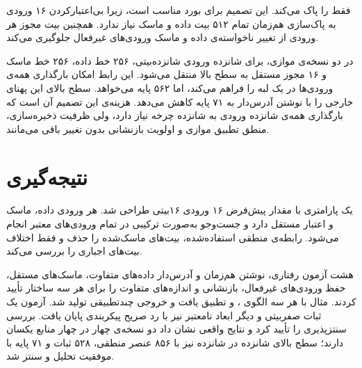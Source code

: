  فقط  را پاک می‌کند. این تصمیم برای بورد مناسب است، زیرا
بی‌اعتبارکردن ۱۶ ورودی به پاک‌سازی هم‌زمان تمام ۵۱۲ بیت داده و ماسک نیاز ندارد. همچنین
بیت مجوز هر ورودی از تغییر ناخواسته‌ی داده و ماسک ورودی‌های غیرفعال جلوگیری می‌کند.

در دو نسخه‌ی موازی، برای شانزده ورودی شانزده‌بیتی، ۲۵۶ خط داده، ۲۵۶ خط ماسک و ۱۶ مجوز مستقل به سطح بالا منتقل می‌شود. این رابط امکان بارگذاری همه‌ی ورودی‌ها در یک لبه را فراهم می‌کند، اما ۵۶۲ پایه می‌خواهد. سطح بالای  این پهنای خارجی را با نوشتن آدرس‌دار به ۷۱ پایه کاهش می‌دهد. هزینه‌ی این تصمیم آن است که بارگذاری همه‌ی شانزده ورودی به شانزده چرخه نیاز دارد، ولی ظرفیت ذخیره‌سازی، منطق تطبیق موازی و اولویت بازنشانی بدون تغییر باقی می‌مانند.

\section{نتیجه‌گیری}

یک  پارامتری با مقدار پیش‌فرض ۱۶ ورودی ۱۶‌بیتی طراحی شد. هر ورودی داده، ماسک
و اعتبار مستقل دارد و جست‌وجو به‌صورت ترکیبی در تمام ورودی‌های معتبر انجام می‌شود. رابطه‌ی
منطقی استفاده‌شده، بیت‌های ماسک‌شده را حذف و فقط اختلاف بیت‌های اجباری را بررسی می‌کند.

هشت آزمون رفتاری، نوشتن هم‌زمان و آدرس‌دار داده‌های متفاوت، ماسک‌های مستقل، حفظ ورودی‌های غیرفعال،
بازنشانی و اندازه‌های متفاوت را برای هر سه ساختار تأیید کردند. مثال 
با هر سه الگوی ،  و  تطبیق یافت
و خروجی چندتطبیقی  تولید شد. آزمون یک ثبات صفر‌بیتی و دیگر ابعاد نامعتبر
نیز با رد صریح پیکربندی پایان یافت. بررسی  سنتزپذیری را تأیید کرد و نتایج واقعی  نشان داد دو نسخه‌ی چهار در چهار منابع یکسان دارند؛ سطح بالای شانزده در شانزده نیز با ۸۵۶ عنصر منطقی، ۵۲۸ ثبات و ۷۱ پایه با موفقیت تحلیل و سنتز شد.
